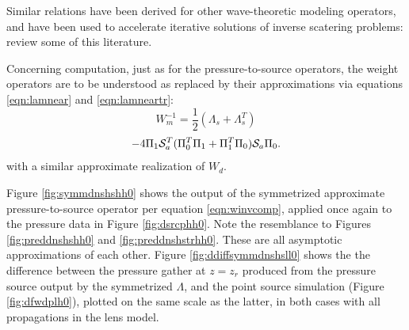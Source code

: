 \documentclass[12pt]{geophysics}
\begin{document}
Similar relations have been derived for other wave-theoretic modeling operators,
and have been used to accelerate iterative solutions of inverse
scatering problems: \cite{DafniSymes:SEG18b} review some of this
literature.

Concerning computation, just as for the pressure-to-source operators,
the weight operators are to be understood as replaced by their
approximations via equations \ref{eqn:lamnear} and \ref{eqn:lamneartr}:
\[
W_m^{-1} = \frac{1}{2}(\Lambda_s +
\Lambda_s^T)
\]
\begin{equation}
  \label{eqn:winvcomp}
  -4\Pi_1 {\cal S}_a^T(\Pi_0^T\Pi_1+ \Pi_1^T\Pi_0){\cal S}_a\Pi_0.
\end{equation}
with a similar approximate realization of $W_d$.

Figure \ref{fig:symmdnshshh0} shows the output of the symmetrized
approximate pressure-to-source operator per equation \ref{eqn:winvcomp},
applied once again to the pressure data in Figure
\ref{fig:dsrcphh0}. Note the resemblance to Figures
\ref{fig:preddnshshh0} and \ref{fig:preddnshstrhh0}. These are all
asymptotic approximations of each other. Figure
\ref{fig:ddiffsymmdnshsll0} shows the
 the difference between the pressure gather at $z=z_r$ produced from
 the pressure source output by the symmetrized $\Lambda$, and the point source
simulation (Figure \ref{fig:dfwdplh0}), plotted on the same scale as
the latter, in both cases with all propagations in the lens model.
\end{document}
